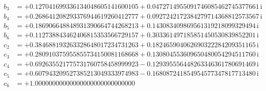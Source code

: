 {\begin{align*}
b_{3} &= +0.127041699336134048605141600105 + 0.0472714955091746085462745377661\,\mathrm{i}\\
b_{4} &= +0.268641208293376944619260412777 + 0.0927242172384279714368812573567\,\mathrm{i}\\
b_{5} &= +0.186906648848931390664744268213 + 0.143083409869561319218099329494\,\mathrm{i}\\
b_{6} &= +0.112738843462406815353566729157 + 0.303361497185851450530839852201\,\mathrm{i}\\[1mm]
c_{2} &= +0.384688193263328648017234731263 + 0.182465904062690322284209351165\,\mathrm{i}\\
c_{3} &= +0.280910375955855734150081168668 + 0.130804553609650480054294511760\,\mathrm{i}\\
c_{4} &= +0.692635521775731760758458999923 - 0.129395556448263346361780691469\,\mathrm{i}\\
c_{5} &= +0.607943209527385213049333974983 - 0.168087241854954577347817713480\,\mathrm{i}\\
c_{6} &= +1.00000000000000000000000000000
\end{align*}
}


